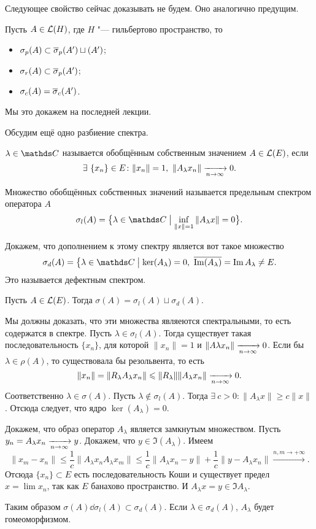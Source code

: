 Следующее свойство сейчас доказывать не будем. Оно аналогично предущим.
\begin{Ut}
  Пусть $A\in\mathcal L(H)$, где $H$ "--- гильбертово пространство, то 
\begin{itemize}
\item $\sigma_p(A)\subset\overline{\sigma}_p(A')\sqcup(A')$;
\item $\sigma_r(A)\subset\overline{\sigma}_p(A')$;
\item $\sigma_c(A) = \overline{\sigma}_c(A')$.
\end{itemize}
\end{Ut}
Мы это докажем на последней лекции.

Обсудим ещё одно разбиение спектра.
\begin{Def}
  $\lambda\in \C$ называется обобщённым собственным значением $A\in\mathcal L(E)$, если
\[
  \exists\ \{x_n\}\in E\colon \|x_n\|=1,\ \|A_\lambda x_n\|\te 0.
\]

Множество обобщённых собственных значений называется  предельным спектром оператора $A$
\[
  \sigma_l(A) = \big\{\lambda\in\C\bigm|\inf\limits_{\|x\|=1}\|A_\lambda x\| = 0\big\}.
\]
\end{Def}

Докажем, что дополнением к этому спектру является вот такое множество
\[
  \sigma_d(A) = \big\{\lambda\in\C\bigm| \ker(A_\lambda) = 0,\ \ol{\Im(A_\lambda)} = \Im A_\lambda\ne E.
\]
Это называется дефектным спектром.

\begin{Ut}
  Пусть $A\in\mathcal L(E)$. Тогда $\sigma(A) = \sigma_l(A)\sqcup \sigma_d(A)$.
\end{Ut}
\begin{Proof}
Мы должны доказать, что эти множества являеются спектральными, то есть содержатся в спектре. Пусть $\lambda\in \sigma_l(A)$. Тогда существует такая последовательность $\{x_n\}$, для которой $\|x_n\|=1$ и $\|A\lambda x_n\|\xrightarrow[n\rightarrow\infty]{} 0$. Если бы $\lambda\in\rho(A)$, то существовала бы резольвента, то есть
\[
  \|x_n\| = \|R_\lambda A_\lambda x_n\|\leqslant 
  \|R_\lambda\| \|A_\lambda x_n\|\xrightarrow[n\rightarrow\infty]{} 0.
\]
Соответственно $\lambda\in \sigma(A)$.
Пусть $\lambda\not\in \sigma_l(A)$. Тогда $\exists\ c>0\colon \|A_\lambda x\|\ge c\|x\|$. Отсюда следует, что ядро $\ker(A_\lambda)=0$.

Докажем, что образ оператор $A_\lambda$ является замкнутым множеством. Пусть $y_n = A_\lambda x_n\xrightarrow[n\rightarrow\infty]{} y$. Докажем, что $y\in\Im(A_\lambda)$. Имеем
\[
  \|x_m-x_n\|\le \frac1c\|A_\lambda x_n A_\lambda x_m\|\le 
  \frac1c\|A_\lambda x_n - y\| + \frac1c\|y - A_\lambda x_n\|\xrightarrow{n,m\to+\infty}.
\]
Отсюда $\{x_n\}\subset E$ есть последовательность Коши и существует предел $x = \lim x_n$, так как $E$ банахово пространство. И $A_\lambda x = y\in \Im A_\lambda$.

Таким образом $\sigma(A)\dd \sigma_l(A)\subset \sigma_d(A)$. Если $\lambda\in \sigma_d(A)$, $A_\lambda$ будет гомеоморфизмом.
\end{Proof}

